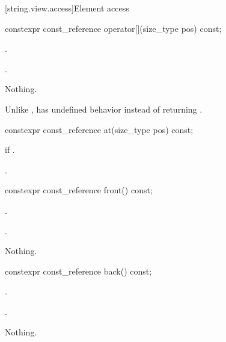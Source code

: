 [string.view.access]{Element access}

%
\begin{itemdecl}
constexpr const_reference operator[](size_type pos) const;
\end{itemdecl}

\begin{itemdescr}
\pnum
\requires
{}.

\pnum
\returns
{}.

\pnum
\throws
Nothing.

\pnum
\begin{note}
Unlike ,
 has undefined behavior instead of returning .
\end{note}
\end{itemdescr}

%
\begin{itemdecl}
constexpr const_reference at(size_type pos) const;
\end{itemdecl}

\begin{itemdescr}
\pnum
\throws
{} if .

\pnum
\returns
{}.
\end{itemdescr}

%
\begin{itemdecl}
constexpr const_reference front() const;
\end{itemdecl}

\begin{itemdescr}
\pnum
\requires
{}.

\pnum
\returns
{}.

\pnum
\throws
Nothing.
\end{itemdescr}

%
\begin{itemdecl}
constexpr const_reference back() const;
\end{itemdecl}

\begin{itemdescr}
\pnum
\requires
{}.

\pnum
\returns
{}.

\pnum
\throws
Nothing.
\end{itemdescr}

